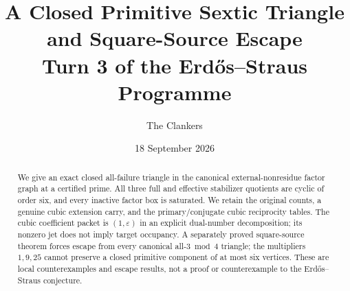 \documentclass[11pt,reqno]{amsart}
\title[Primitive sextic triangle and square-source escape]{A Closed Primitive Sextic Triangle and Square-Source Escape\\Turn 3 of the Erd\H{o}s--Straus Programme}
\author{The Clankers}
\date{18 September 2026}
\begin{document}
\begin{abstract}
We give an exact closed all-failure triangle in the canonical external-nonresidue
factor graph at a certified prime. All three full and effective stabilizer quotients
are cyclic of order six, and every inactive factor box is saturated. We retain the
original counts, a genuine cubic extension carry, and the primary/conjugate cubic
reciprocity tables. The cubic coefficient packet is $(1,\varepsilon)$ in an explicit
dual-number decomposition; its nonzero jet does not imply target occupancy.
A separately proved square-source theorem forces escape from every canonical
all-$3\bmod4$ triangle; the multipliers $1,9,25$ cannot preserve a closed primitive
component of at most six vertices. These are local counterexamples and escape
results, not a proof or counterexample to the Erd\H{o}s--Straus conjecture.
\end{abstract}
\maketitle

\clearpage

\end{document}
